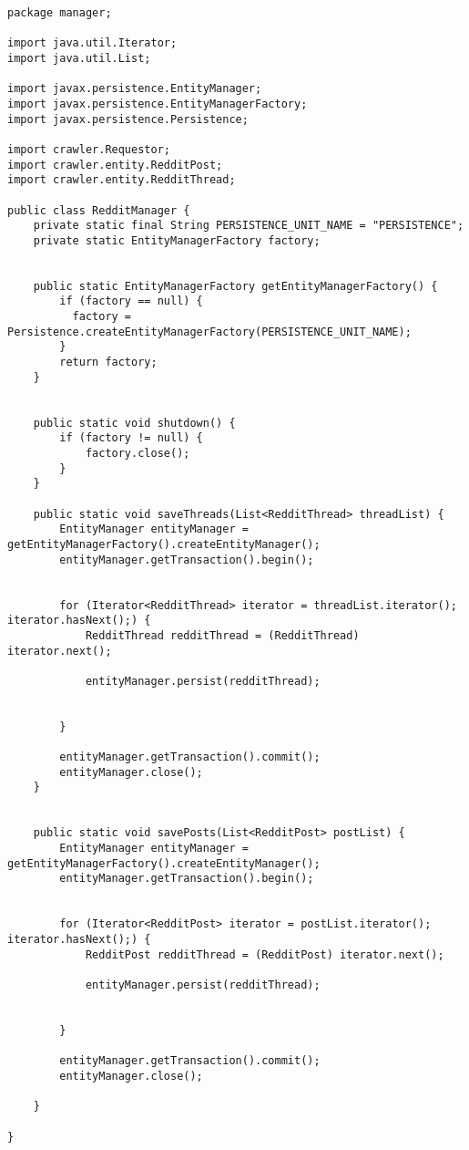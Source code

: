 \begin{lstlisting}
package manager;

import java.util.Iterator;
import java.util.List;

import javax.persistence.EntityManager;
import javax.persistence.EntityManagerFactory;
import javax.persistence.Persistence;

import crawler.Requestor;
import crawler.entity.RedditPost;
import crawler.entity.RedditThread;

public class RedditManager {
	private static final String PERSISTENCE_UNIT_NAME = "PERSISTENCE";
	private static EntityManagerFactory factory;
	

	public static EntityManagerFactory getEntityManagerFactory() {
	    if (factory == null) {
	      factory = Persistence.createEntityManagerFactory(PERSISTENCE_UNIT_NAME);
	    }
	    return factory;
	}


	public static void shutdown() {
		if (factory != null) {
			factory.close();
		}
	}

	public static void saveThreads(List<RedditThread> threadList) {
		EntityManager entityManager = getEntityManagerFactory().createEntityManager();
		entityManager.getTransaction().begin();  
		
		
		for (Iterator<RedditThread> iterator = threadList.iterator(); iterator.hasNext();) {
			RedditThread redditThread = (RedditThread) iterator.next();

			entityManager.persist(redditThread);


		}

		entityManager.getTransaction().commit();
		entityManager.close();
	}


	public static void savePosts(List<RedditPost> postList) {
		EntityManager entityManager = getEntityManagerFactory().createEntityManager();
		entityManager.getTransaction().begin();  
		
		
		for (Iterator<RedditPost> iterator = postList.iterator(); iterator.hasNext();) {
			RedditPost redditThread = (RedditPost) iterator.next();

			entityManager.persist(redditThread);


		}

		entityManager.getTransaction().commit();
		entityManager.close();
		
	}

}
\end{lstlisting}